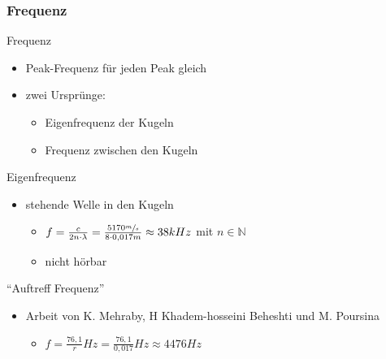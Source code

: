 \documentclass[12pt]{beamer}
\begin{document}
\subsubsection{Frequenz}
\begin{frame}{Frequenz}
\begin{itemize}
\item<1-> Peak-Frequenz für jeden Peak gleich
\item<2-> zwei Ursprünge:
	\begin{itemize}
	\item<2-> Eigenfrequenz der Kugeln
	\item<3-> Frequenz zwischen den Kugeln
	\end{itemize}
\end{itemize}
\end{frame}

\begin{frame}{Eigenfrequenz}
\begin{itemize}
\item<1-> stehende Welle in den Kugeln
	\begin{itemize}
	\item<2->[$\rightarrow$] $f=\frac{c}{2n\cdot\lambda}=\frac{5170\sfrac{m}{s}}{8\cdot 0,017m}\approx 38kHz$ mit $n\in \mathbb{N}$
	\item<3->[$\rightarrow$] nicht hörbar
	\end{itemize}
\end{itemize}
\end{frame}

\begin{frame}{"`Auftreff Frequenz"'}
\begin{itemize}
\item<1-> Arbeit von K. Mehraby, H Khadem-hosseini Beheshti und M. Poursina\footnotemark
	\begin{itemize}
	\item<2->[$\rightarrow$] $f=\frac{76,1}{r}Hz=\frac{76,1}{0,017}Hz\approx 4476Hz$
	\end{itemize}
\end{itemize}
\end{frame}
\end{document}
